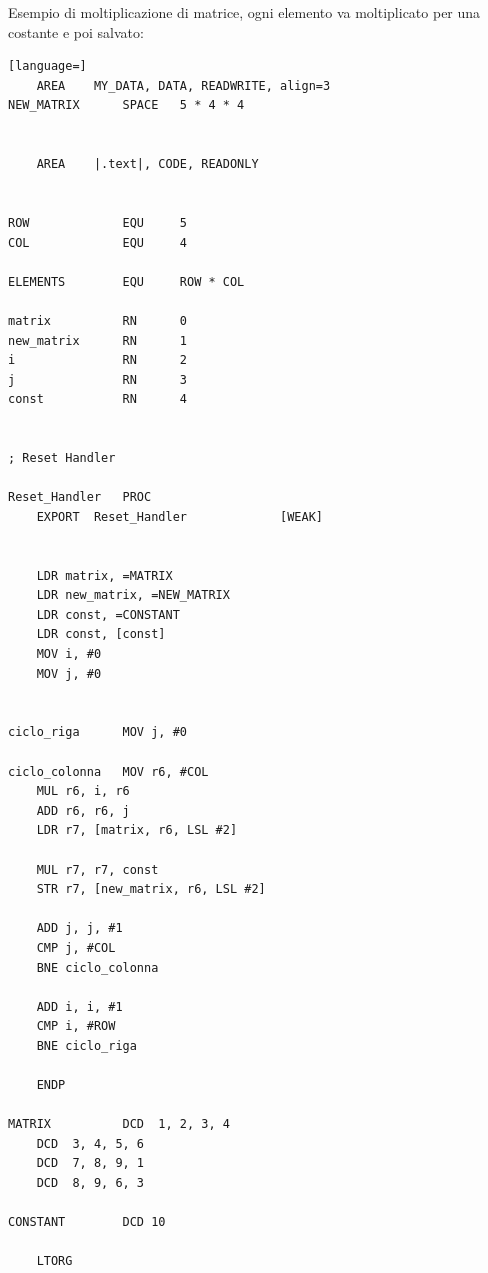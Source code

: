 \documentclass[12pt]{article}
\begin{document}
Esempio di moltiplicazione di matrice, ogni elemento va moltiplicato per una costante e poi salvato:
\begin{lstlisting}[language=]
    AREA 	MY_DATA, DATA, READWRITE, align=3
NEW_MATRIX		SPACE 	5 * 4 * 4


    AREA    |.text|, CODE, READONLY


ROW 			EQU 	5
COL				EQU		4

ELEMENTS		EQU		ROW * COL

matrix 			RN		0
new_matrix		RN		1
i 				RN		2
j				RN		3
const			RN		4


; Reset Handler

Reset_Handler   PROC
    EXPORT  Reset_Handler             [WEAK]
        
    
    LDR matrix, =MATRIX
    LDR new_matrix, =NEW_MATRIX
    LDR	const, =CONSTANT
    LDR const, [const]
    MOV	i, #0
    MOV j, #0
    

ciclo_riga		MOV j, #0

ciclo_colonna	MOV	r6, #COL
    MUL r6, i, r6
    ADD r6, r6, j
    LDR r7, [matrix, r6, LSL #2]
    
    MUL r7, r7, const
    STR	r7, [new_matrix, r6, LSL #2]
    
    ADD j, j, #1
    CMP j, #COL
    BNE	ciclo_colonna
    
    ADD i, i, #1
    CMP i, #ROW
    BNE ciclo_riga      
    
    ENDP

MATRIX  		DCD  1, 2, 3, 4
    DCD  3, 4, 5, 6
    DCD  7, 8, 9, 1
    DCD  8, 9, 6, 3

CONSTANT    	DCD 10

    LTORG
\end{lstlisting}
\end{document}
